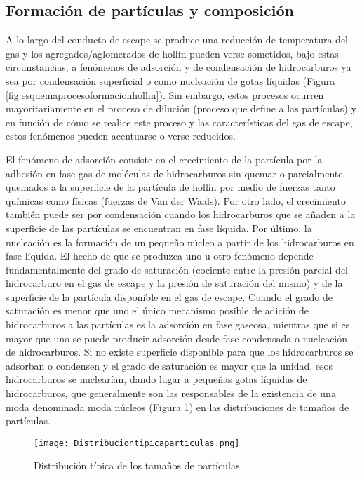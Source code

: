 \subsection{Formación de partículas y composición}\label{subsec:formacionparticulasycomposicion}

\par A lo largo del conducto de escape se produce una reducción de temperatura del gas y los agregados/aglomerados de hollín pueden verse sometidos, bajo estas circunstancias, a fenómenos de adsorción y de condensación de hidrocarburos ya sea por condensación superficial o como nucleación de gotas líquidas (Figura \ref{fig:esquemaprocesoformacionhollin}). Sin embargo, estos procesos ocurren mayoritariamente en el proceso de dilución (proceso que define a las partículas) y en función de cómo se realice este proceso y las características del gas de escape, estos fenómenos pueden acentuarse o verse reducidos. 

\par El fenómeno de adsorción consiste en el crecimiento de la partícula por la adhesión en fase gas de moléculas de hidrocarburos sin quemar o parcialmente quemados a la superficie de la partícula de hollín por medio de fuerzas tanto químicas como físicas (fuerzas de Van der Waals). Por otro lado, el crecimiento también puede ser por condensación cuando los hidrocarburos que se añaden a la superficie de las partículas se encuentran en fase líquida. Por último, la nucleación es la formación de un pequeño núcleo a partir de los hidrocarburos en fase líquida. El hecho de que se produzca uno u otro fenómeno depende fundamentalmente del grado de saturación  (cociente entre la presión parcial del hidrocarburo en el gas de escape y la presión de saturación del mismo) y de la superficie de la partícula disponible en el gas de escape. Cuando el grado de saturación es menor que uno el único mecanismo posible de adición de hidrocarburos a las partículas es la adsorción en fase gaseosa, mientras que si es mayor que uno se puede producir adsorción desde fase condensada o nucleación de hidrocarburos. Si no existe superficie disponible para que los hidrocarburos se adsorban o condensen y el grado de saturación es mayor que la unidad, esos hidrocarburos se nuclearían, dando lugar a pequeñas gotas líquidas de hidrocarburos, que generalmente son las responsables de la existencia de una moda denominada moda núcleos (Figura \ref{fig:distribuciontipicaparticulas}) en las distribuciones de tamaños de partículas. 

\begin{figure}[ht]
\centering
	\texttt{[image: Distribuciontipicaparticulas.png]}	 
	\caption{Distribución típica de los tamaños de partículas} \label{fig:distribuciontipicaparticulas}
\end{figure} 


